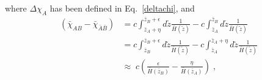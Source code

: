 \documentclass[notitlepage,nofootinbib]{revtex4-1}
\begin{document}
where $\Delta \chi_A$ has been defined in Eq.~\eqref{deltachi}, and
\begin{equation}\label{secondterm}
\begin{split}
    \left(\bar{\chi}_{AB}-\bar{\chi}_{\bar{A}\bar{B}}\right)&= c\int_{\bar{z}_A+\eta}^{\bar{z}_B+\epsilon} d\tilde{z} \frac{1}{\bar{H}(\tilde{z})} - c\int_{\bar{z}_A}^{\bar{z}_B} d\tilde{z} \frac{1}{\bar{H}(\tilde{z})}\\
    &=c\int_{\bar{z}_B}^{\bar{z}_B+\epsilon} d\tilde{z} \frac{1}{\bar{H}(\tilde{z})} - c\int_{\bar{z}_A}^{\bar{z}_A +\eta} d\tilde{z} \frac{1}{\bar{H}(\tilde{z})}\\
    &\approx\; c\left(\frac{\epsilon}{\bar{H}(\bar{z}_B)} -\frac{\eta}{\bar{H}(\bar{z}_A)} \right)\;,
\end{split}    
\end{equation}
\end{document}
